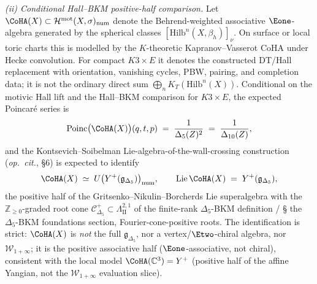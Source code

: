 \begin{theorem}
\medskip

\emph{(ii) Conditional Hall--BKM positive-half comparison.}
Let $\CoHA(X)\subset\mathcal H^{\mathrm{mot}}(X,\sigma)_{\mathrm{num}}$
denote the Behrend-weighted associative $\Eone$-algebra generated by
the spherical classes $[\mathrm{Hilb}^n(X,\beta_h)]_\nu$. On surface or
local toric charts this is modelled by the $K$-theoretic
Kapranov--Vasserot CoHA under Hecke convolution. For compact
\(K3\times E\) it denotes the constructed DT/Hall replacement with
orientation, vanishing cycles, PBW, pairing, and completion data; it is
not the ordinary direct sum \(\bigoplus_n K_T(\mathrm{Hilb}^n(X))\).
Conditional on the motivic Hall lift and the
Hall--BKM comparison for $K3\times E$, the expected Poincar\'e series is
\[
 \mathrm{Poinc}\bigl(\CoHA(X)\bigr)(q,t,p)
 \;=\;
 \frac{1}{\Delta_5(Z)^2}
 \;=\;
 \frac{1}{\Delta_{10}(Z)},
\]
and the Kontsevich--Soibelman Lie-algebra-of-the-wall-crossing
construction (\emph{op.\ cit.}, \S6) is expected to identify
\[
 \CoHA(X) \;\simeq\; U\bigl(Y^+(\mathfrak g_{\Delta_5})\bigr)_{\mathrm{num}},
 \qquad
 \mathrm{Lie}\,\CoHA(X) \;=\; Y^+(\mathfrak g_{\Delta_5}),
\]
the positive half of the Gritsenko--Nikulin--Borcherds Lie
superalgebra with the $\mathbb Z_{\geq 0}$-graded root cone
$\mathcal C_{\Delta_5}^+\subset\Lambda_{\mathrm{II}}^{2,1}$ of
the finite-rank $\Delta_5$-BKM definition / \S%
the $\Delta_5$-BKM foundations section, Fourier-cone-positive roots. The
identification is strict: $\CoHA(X)$ is \emph{not} the full
$\mathfrak g_{\Delta_5}$, nor a vertex/$\Etwo$-chiral algebra, nor
$\mathcal W_{1+\infty}$; it is the positive associative half
($\Eone$-associative, not chiral), consistent with the local model
$\CoHA(\mathbb C^3)=Y^+$ (positive half of the affine Yangian, not the
$\mathcal W_{1+\infty}$ evaluation slice).

\medskip


\end{theorem}
